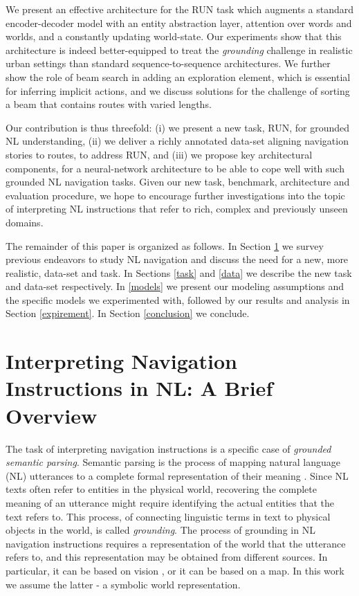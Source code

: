 \documentclass[11pt,a4paper]{article}
\begin{document}
We present an effective  architecture for the RUN task which augments a standard encoder-decoder model with an entity abstraction layer, attention over words and worlds, and a constantly updating world-state.
Our experiments show that this architecture is indeed better-equipped to treat the \textit{grounding} challenge in realistic urban settings than standard sequence-to-sequence architectures. We further show the role of beam search in adding an exploration element, which is essential for inferring implicit actions, and we discuss solutions for the challenge of sorting a beam that contains routes with varied lengths.

Our contribution is thus threefold: (i) we present a new task, RUN, for grounded NL understanding, (ii) we deliver a richly annotated data-set aligning navigation stories to routes, to address RUN,  and (iii) we propose key architectural components, for a neural-network architecture to be able to cope well with such grounded NL navigation tasks.
Given our new task,  benchmark,  architecture and evaluation procedure, we hope to encourage further investigations into the topic of interpreting NL instructions that refer to rich, complex and previously unseen domains.  

The remainder of this paper is organized as follows. In Section \ref{background} we survey previous endeavors to study NL navigation and discuss the need for a new, more realistic, data-set and task. In Sections \ref{task} and \ref{data}  we describe the new task and data-set respectively. In \ref{models} we present our modeling assumptions and the   specific models we experimented with, followed by our  results and analysis in Section \ref{expirement}. In Section \ref{conclusion} we conclude.


\section{Interpreting  Navigation Instructions in NL: A Brief   Overview}
\label{background}

The task of interpreting navigation instructions is a specific case of {\em grounded semantic parsing}. Semantic parsing is the process of mapping natural language (NL) utterances to a complete formal representation of their  meaning \cite{liang15,abend2017state}.
Since NL texts often refer to entities in the physical world,  recovering the complete meaning of an utterance  might require identifying the actual  entities   that the text refers to. This process, of connecting linguistic terms in text to physical objects in the world, is called \textit{grounding}. 
The process of grounding in NL navigation  instructions requires a representation of the world that the utterance refers to, and this representation   may be obtained from different sources. In particular, it can be based on vision \citep{anderson2018vision,blukis2018following,chen2018touchdown,yan2018chalet,misra2018mapping}, or it can be based on a  map.  In this work we assume the latter - a symbolic world representation.
\end{document}

